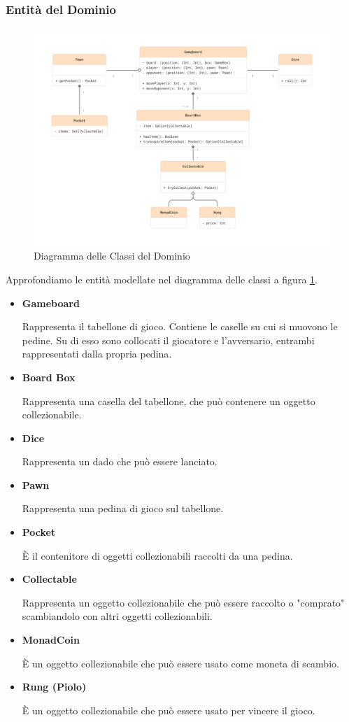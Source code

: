 \subsubsection{Entità del Dominio}
\begin{figure}[h!]
\centering
\includegraphics[width=1\textwidth]{figures/domain-class-diagram.png}
\caption{Diagramma delle Classi del Dominio}
\label{fig:domain-class-diagram}
\end{figure}
Approfondiamo le entità modellate nel diagramma delle classi 
a figura \ref{fig:domain-class-diagram}.
\begin{itemize}
    \item \textbf{Gameboard}\par
    Rappresenta il tabellone di gioco. Contiene le caselle 
    su cui si muovono le pedine. Su di esso sono collocati il giocatore
    e l'avversario, entrambi rappresentati dalla propria pedina.
    \item \textbf{Board Box}\par
    Rappresenta una casella del tabellone, che può contenere un oggetto
    collezionabile.
    \item \textbf{Dice}\par
    Rappresenta un dado che può essere lanciato.
    \item \textbf{Pawn}\par
    Rappresenta una pedina di gioco sul tabellone.
    \item \textbf{Pocket}\par
    È il contenitore di oggetti collezionabili raccolti da una pedina.
    \item \textbf{Collectable}\par
    Rappresenta un oggetto collezionabile che può essere raccolto o
    "comprato" scambiandolo con altri oggetti collezionabili.
    \item \textbf{MonadCoin}\par
    È un oggetto collezionabile che può essere usato come moneta di scambio.
    \item \textbf{Rung (Piolo)}\par
    È un oggetto collezionabile che può essere usato per vincere il gioco.
\end{itemize}
